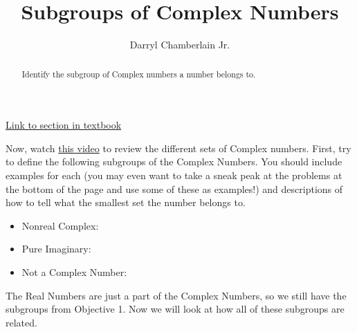 \documentclass{ximera}
\author{Darryl Chamberlain Jr.}
\title{Subgroups of Complex Numbers}
\begin{document}
\begin{abstract}
Identify the subgroup of Complex numbers a number belongs to. 
\end{abstract}
\maketitle

\href{https://cnx.org/contents/mwjClAV_@8.1:Sqk1HAGf@9/Complex-Numbers}{Link to section in textbook}


Now, watch \href{https://mediasite.video.ufl.edu/Mediasite/Play/8fae3825474042a297038c5d2385c4f51d}{this video} to review the different sets of Complex numbers. First, try to define the following subgroups of the Complex Numbers. You should include examples for each (you may even want to take a sneak peak at the problems at the bottom of the page and use some of these as examples!) and descriptions of how to tell what the smallest set the number belongs to. 

\begin{itemize}
\item Nonreal Complex:
\item Pure Imaginary:
\item Not a Complex Number: 
\end{itemize}

The Real Numbers are just a part of the Complex Numbers, so we still have the subgroups from Objective 1. Now we will look at how all of these subgroups are related. 
\end{document}
